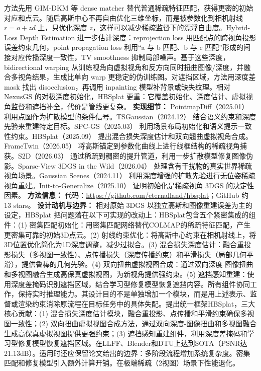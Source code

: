 方法先用 GIM-DKM 等 dense matcher 替代普通稀疏特征匹配，获得更密的初始对应和点云。随后高斯中心不再自由优化三维坐标，而是被参数化到相机射线 $r=o+zd$ 上，只优化深度 $z$，这样可以减少稀疏监督下的漂浮自由度。Hybrid-Loss Depth Estimation 进一步估计深度：reprojection loss 用匹配点的跨视角投影误差约束几何，point propagation loss 利用“a 与 b 匹配、b 与 c 匹配”形成的间接对应传播深度一致性，TV smoothness 抑制局部噪声。基于这些深度，bidirectional warping 从训练视角向虚拟视角和反方向同时扭曲图像/深度，并融合多视角结果，生成比单向 warp 更稳定的伪训练图。对遮挡区域，方法用深度差 mask 找出 disocclusion，再调用 inpainting 模型补背景或缺失纹理。相对 NexusGS 的对极深度初始化，HBSplat 更重：它覆盖初始化、深度估计、虚拟视角监督和遮挡补全，代价是管线更复杂。
\textbf{实现细节：} PointmapDiff（2025.01） 利用点图作为扩散模型的条件信号。TSGaussian（2024.12） 结合语义约束和深度先验来重建特定目标。SPC-GS（2025.03） 利用场景布局初始化和语义提示一致性约束。HBSplat（2025.09） 提出混合损失深度估计和双向翘曲虚拟视角合成。FrameTwin（2026.05） 将高斯锚定到参数化曲线上进行线框结构的稀疏视角捕获。S2D（2026.03） 通过稀疏到稠密的提升管道，利用一步扩散模型修复图像伪影。Sparse-View 3DGS in the Wild（2026.04） 处理含有干扰物的真实世界稀疏视角场景。Gaussian Scenes（2024.11） 利用深度增强的扩散先验进行无位姿稀疏视角重建。Init-to-Generalize（2025.10） 证明初始化是稀疏视角 3DGS 的决定性因素。
\textbf{方法信息：} 代码：\url{https://github.com/eternalland/hbsplat}；GitHub 约 13 stars。
\textbf{设计动机与边界：} 相对原始 3DGS 以独立高斯和图像重建误差为主的设定，HBSplat 把问题落在以下可实现的改动上：HBSplat包含五个紧密集成的组件：(1) 密集匹配初始化：用密集匹配网络替代COLMAP的稀疏特征匹配，产生更密集可靠的初始3D点云。(2) 射线约束优化：将高斯中心约束在相机射线上，将3D位置优化简化为1D深度调整，减少过拟合。(3) 混合损失深度估计：融合重投影损失（多视图一致性）、点传播损失（深度传播约束）和平滑损失（局部几何平滑），提供鲁棒的几何先验。(4) 双向扭曲虚拟视图合成：通过双向深度-图像扭曲和多视图融合生成高保真虚拟视图，为新视角提供强约束。(5) 遮挡感知重建：使用深度差掩码识别遮挡区域，结合学习型修复模型恢复遮挡内容。所有组件协同工作，保持实时推理能力。其设计目的不是单独增加一个模块，而是用上述表示、监督或渲染约束消除原流程在目标任务中的具体失配。提出统一框架HBSplat，三大核心贡献：(1) 混合损失深度估计模块，融合重投影、点传播和平滑约束确保多视图一致性；(2) 双向扭曲虚拟视图合成方法，通过双向深度-图像扭曲和多视图融合生成高保真虚拟视图提供更强约束；(3) 遮挡感知重建组件，利用深度差掩码和学习型修复模型恢复遮挡区域。在LLFF、Blender和DTU上达到SOTA（PSNR达21.13dB）。适用时还应保留论文给出的边界：多阶段流程增加系统复杂度。密集匹配和修复模型引入额外计算开销。在极端稀疏（2视图）场景下性能退化。

